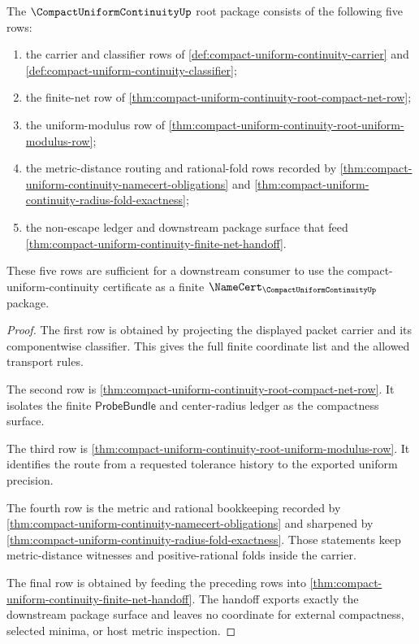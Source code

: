 \begin{theorem}
\label{thm:compact-uniform-continuity-root-namecert-unblock-package}
The $\CompactUniformContinuityUp$ root package consists of the following five rows:
\begin{enumerate}
\item the carrier and classifier rows of \autoref{def:compact-uniform-continuity-carrier} and \autoref{def:compact-uniform-continuity-classifier};
\item the finite-net row of \autoref{thm:compact-uniform-continuity-root-compact-net-row};
\item the uniform-modulus row of \autoref{thm:compact-uniform-continuity-root-uniform-modulus-row};
\item the metric-distance routing and rational-fold rows recorded by \autoref{thm:compact-uniform-continuity-namecert-obligations} and \autoref{thm:compact-uniform-continuity-radius-fold-exactness};
\item the non-escape ledger and downstream package surface that feed \autoref{thm:compact-uniform-continuity-finite-net-handoff}.
\end{enumerate}
These five rows are sufficient for a downstream consumer to use the compact-uniform-continuity certificate as a finite $\NameCert_{\CompactUniformContinuityUp}$ package.
\end{theorem}
\begin{proof}
The first row is obtained by projecting the displayed packet carrier and its componentwise classifier. This gives the full finite coordinate list and the allowed transport rules.

The second row is \autoref{thm:compact-uniform-continuity-root-compact-net-row}. It isolates the finite $\mathsf{ProbeBundle}$ and center-radius ledger as the compactness surface.

The third row is \autoref{thm:compact-uniform-continuity-root-uniform-modulus-row}. It identifies the route from a requested tolerance history to the exported uniform precision.

The fourth row is the metric and rational bookkeeping recorded by \autoref{thm:compact-uniform-continuity-namecert-obligations} and sharpened by \autoref{thm:compact-uniform-continuity-radius-fold-exactness}. Those statements keep metric-distance witnesses and positive-rational folds inside the carrier.

The final row is obtained by feeding the preceding rows into \autoref{thm:compact-uniform-continuity-finite-net-handoff}. The handoff exports exactly the downstream package surface and leaves no coordinate for external compactness, selected minima, or host metric inspection.
\end{proof}

